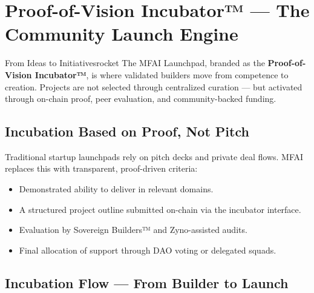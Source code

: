 \section{Proof-of-Vision Incubator™ — The Community Launch Engine}

\begin{mfai-box}{From Ideas to Initiatives}{rocket}
The MFAI Launchpad, branded as the \textbf{Proof-of-Vision Incubator™}, is where validated builders move from competence to creation. Projects are not selected through centralized curation — but activated through on-chain proof, peer evaluation, and community-backed funding.
\end{mfai-box}

\vspace{1em}

\subsection*{Incubation Based on Proof, Not Pitch}

Traditional startup launchpads rely on pitch decks and private deal flows. MFAI replaces this with transparent, proof-driven criteria:

\begin{itemize}
  \item {} Demonstrated ability to deliver in relevant domains.
  \item {} A structured project outline submitted on-chain via the incubator interface.
  \item {} Evaluation by Sovereign Builders™ and Zyno-assisted audits.
  \item {} Final allocation of support through DAO voting or delegated squads.
\end{itemize}

\vspace{2em}

\subsection*{Incubation Flow — From Builder to Launch}


